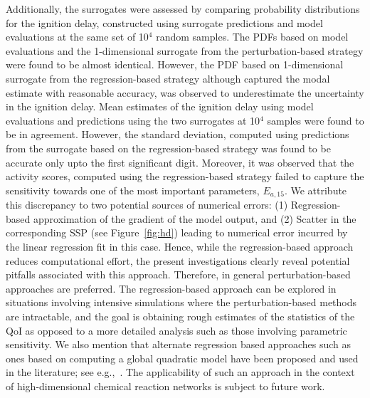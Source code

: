 Additionally, the surrogates were assessed by comparing probability
distributions for the ignition delay,
constructed using surrogate predictions and model evaluations at the same set
of 10$^4$ random samples. The PDFs based on model evaluations and the
1-dimensional surrogate from the perturbation-based strategy were found to be
almost identical. However, the PDF based on 1-dimensional surrogate from the
regression-based strategy although captured the modal estimate with reasonable
accuracy, was observed to underestimate the uncertainty in the ignition delay.
Mean estimates of the ignition delay using model evaluations and predictions
using the two surrogates at 10$^4$ samples were found to be in agreement.
However, the standard deviation, computed using predictions from
the surrogate based on the regression-based strategy was found to be accurate
only upto the first significant digit. Moreover, it was observed that the
activity scores, computed using the regression-based strategy failed to capture
the sensitivity towards one of the most important parameters, $E_{a,15}$.  We attribute
this discrepancy to two potential sources of numerical errors: (1)
Regression-based approximation of the gradient of the model output, and (2)
Scatter in the corresponding SSP (see Figure~\ref{fig:hd}) leading to numerical
error incurred by the linear regression fit in this case. Hence, while the
regression-based approach 
reduces computational effort, the present investigations clearly reveal
potential pitfalls associated with this approach. 
%
Therefore, in general perturbation-based approaches are preferred. The
regression-based approach can be explored in situations involving intensive
simulations where the perturbation-based methods are intractable, and the goal
is obtaining rough estimates of the statistics of the QoI as opposed to a more
detailed analysis such as those involving parametric sensitivity.  We also
mention that alternate regression based approaches such as ones based on
computing a global quadratic model have been proposed and used in the
literature; see e.g.,~\cite{Constantine:2017a}. The applicability of such an
approach in the context of high-dimensional chemical reaction networks is
subject to future work. 

